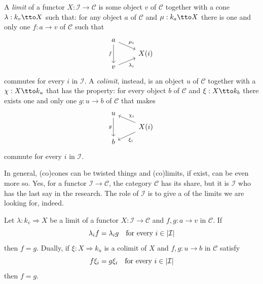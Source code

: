 \begin{definition}\label{definition:LimitsAndColimits}
  A {\em limit} of a functor \(X : \mathcal{I} \to \mathcal{C}\) is some object
  \(v\) of \(\mathcal{C}\) together with a cone \(\lambda : k_v \tto X\) such that:
  for any object \(a\) of \(\mathcal{C}\) and \(\mu : k_a \tto X\) there is one and
  only one \(f : a \to v\) of \(\mathcal{C}\) such that
  \[
    \begin{tikzcd}[row sep=tiny]
      a \ar["{\mu_i}", dr] \ar["f", dd, swap] \\
      & X(i) \\
      v \ar["{\lambda_i}", ur, swap]
    \end{tikzcd}
  \]
  commutes for every \(i\) in \(\mathcal{I}\).
  A {\em colimit}, instead, is an object \(u\) of \(\mathcal{C}\) together with a
  \(\chi : X \tto k_u\) that has the property:
  for every object \(b\) of \(\mathcal{C}\) and \(\xi : X \tto k_b\) there exists
  one and only one \(g : u \to b\) of \(\mathcal{C}\) that makes
  \[
    \begin{tikzcd}[row sep=tiny]
      u  \ar["g", dd, swap] \\
      & X(i) \ar["{\chi_i}", ul, swap] \ar["{\xi_i}", dl]\\
      b
    \end{tikzcd}
  \]
  commute for every \(i\) in \(\mathcal{I}\).
\end{definition}

In general, (co)cones can be twisted things and (co)limits, if exist,
can be even more so. Yes, for a functor \(\mathcal{I} \to \mathcal{C}\), the category
\(\mathcal{C}\) has its share, but it is \(\mathcal{I}\) who has the last say in the
research. The role of \(\mathcal{I}\) is to give a  of the limits we are
looking for, indeed.

\begin{lemma}\label{lemma:UniqueMorphismToLim}
  Let \(\lambda : k_v \Rightarrow X\) be a limit of a functor
  \(X : \mathcal{I} \to \mathcal{C}\) and \(f, g : a \to v\) in \(\mathcal{C}\). If
  \[
    \lambda_i f = \lambda_i g \quad\text{for every } i \in \left\lvert\mathcal{I}\right\rvert
  \]
  then \(f = g\). Dually, if \(\xi : X \Rightarrow k_u\) is a colimit of
  \(X\) and \(f , g : u \to b\) in \(\mathcal{C}\) satisfy
  \[
    f \xi_i = g \xi_i \quad\text{for every } i \in \left\lvert\mathcal{I}\right\rvert
  \]
  then \(f = g\).
\end{lemma}

